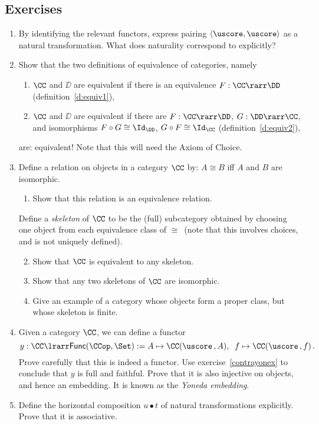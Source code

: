 \documentclass{svmult}
\begin{document}
\subsection{Exercises}
\begin{enumerate}\renewcommand{\theenumi}{\textbf{\arabic{enumi}}}
\item By identifying the relevant functors, express pairing $\langle\uscore,\uscore\rangle$
 as a natural transformation. What does naturality correspond to explicitly?
  \item Show that the two definitions of equivalence of categories, namely
  \begin{enumerate}
    \item $\CC$ and $\DD$ are equivalent if there is an equivalence $F:\CC\rarr\DD$ (definition~\ref{d:equiv1}),
    \item $\CC$ and $\DD$ are equivalent if there are $F:\CC\rarr\DD$, $G:\DD\rarr\CC$, and isomorphisms $F\circ G\cong\Id_{\DD}$, $G\circ
    F\cong\Id_{\CC}$ (definition~\ref{d:equiv2}),
  \end{enumerate}
  are: equivalent!
  Note that this will need the Axiom of Choice.
  \item Define a relation on objects in a category $\CC$ by: $A \cong B$ iff $A$ and $B$ are isomorphic.
    \begin{enumerate}
      \item Show that this relation is an equivalence relation.
    \end{enumerate}
    Define a \emph{skeleton} of $\CC$ to be the (full) subcategory obtained by choosing one object from each equivalence class of $\cong$\, (note that
    this involves choices, and is not uniquely defined).
    \begin{enumerate}\setcounter{enumii}{1}
      \item Show that $\CC$ is equivalent to any skeleton.
      \item Show that any two skeletons of $\CC$ are isomorphic.
      \item Give an example of a category whose objects form a proper class, but whose skeleton is finite.
    \end{enumerate}

\item   Given a category $\CC$, we can define a functor
\[ y : \CC \lrarr \mathsf{Func}(\CCop, \Set) := A \mapsto \CC (\uscore\,,A), \;\; f \mapsto  \CC (\uscore\,,f) \, . \]
Prove carefully that this is indeed a functor. Use exercise~\ref{contrayonex} to  conclude that $y$ is full and faithful. Prove that it is also injective on objects, and hence an embedding. It is known as the \emph{Yoneda embedding}.

\item Define the horizontal composition $u \bullet t$ of natural transformations explicitly. Prove that it is associative.
\end{enumerate}
\end{document}
